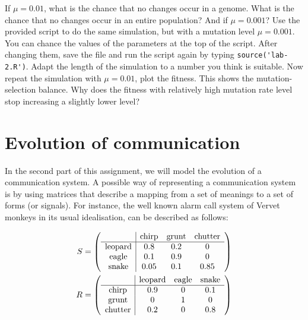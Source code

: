 \documentclass[a4paper, 9pt]{article}
\begin{document}
\begin{exercise}
    \action If $\mu=0.01$, what is the chance that no changes occur in a genome. What is the chance that no changes occur in an entire population? And if $\mu=0.001$?
    \action Use the provided script to do the same simulation, but with a mutation level $\mu=0.001$. You can chance the values of the parameters at the top of the script. After changing them, save the file and run the script again by typing \verb|source('lab-2.R')|. Adapt the length of the simulation to a number you think is suitable.
    \action Now repeat the simulation with $\mu=0.01$, plot the fitness. This shows the mutation-selection balance.
    \askstar Why does the fitness with relatively high mutation rate level stop increasing a slightly lower level?
\end{exercise}

\section{Evolution of communication}\label{evolution-of-communication}

In the second part of this assignment, we will model the evolution of a
communication system. A possible way of representing a communication
system is by using matrices that describe a mapping from a set of
meanings to a set of forms (or signals). For instance, the well known
alarm call system of Vervet monkeys \cite{seyfarth1980monkey} in its
usual idealisation, can be described as follows:

\begin{align*}\footnotesize
S &=
  \left(
  \begin{array}{c|ccc}
  & \text{chirp} & \text{grunt} & \text{chutter}\\
  \hline
  \text{leopard} & 0.8 & 0.2 & 0\\
  \text{eagle} & 0.1 & 0.9 & 0\\
  \text{snake} & 0.05 & 0.1 & 0.85 \\
  \end{array}
  \right)
  \\
R &=
  \left(
  \begin{array}{c|ccc}
  & \text{leopard} & \text{eagle} & \text{snake}\\
  \hline
  \text{chirp} & 0.9 & 0 & 0.1\\
  \text{grunt} & 0 & 1 & 0\\
  \text{chutter} & 0.2 & 0 & 0.8\\
  \end{array}
  \right)
\end{align*}
\end{document}

